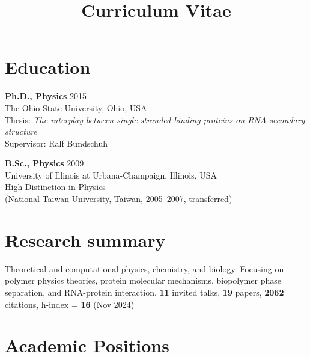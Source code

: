 \documentclass[11pt]{../yhlcv}
\begin{document}
\title{Curriculum Vitae}

\maketitle

\raggedright

\section*{Education}

{\bf Ph.D., Physics} \hfill 2015 \vspace{0.25em}\\
The Ohio State University, Ohio, USA \\
Thesis: {\it  The interplay between single-stranded binding proteins on RNA secondary structure} \\
Supervisor: Ralf Bundschuh

{\bf B.Sc., Physics} \hfill 2009 \vspace{0.25em}\\
University of Illinois at Urbana-Champaign, Illinois, USA \\
High Distinction in Physics \\
{\small (National Taiwan University, Taiwan, 2005--2007, transferred)}

\section*{Research summary}

Theoretical and computational physics, chemistry, and biology. Focusing on polymer physics theories, protein molecular mechanisms, biopolymer phase separation, and RNA-protein interaction. 
{\bf 11} invited talks, {\bf 19} papers, {\bf 2062} citations, h-index = {\bf 16} (Nov 2024)

\section*{Academic Positions}
\end{document}
